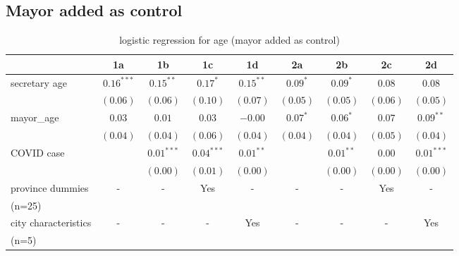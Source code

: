 \documentclass{article}
\begin{document}
\begin{CJK}{UTF8}{gbsn}
\subsection{Mayor added as control}
\begin{table}[H]
\caption{logistic regression for age (mayor added as control)}
\begin{center}
\begin{tabular}{l c c c c c c c c}
\hline
 & 1a & 1b & 1c & 1d & 2a & 2b & 2c & 2d \\
\hline
secretary age  & $0.16^{***}$ & $0.15^{**}$  & $0.17^{*}$   & $0.15^{**}$ & $0.09^{*}$ & $0.09^{*}$  & $0.08$    & $0.08$       \\
               & $(0.06)$     & $(0.06)$     & $(0.10)$     & $(0.07)$    & $(0.05)$   & $(0.05)$    & $(0.06)$  & $(0.05)$     \\
mayor\_age     & $0.03$       & $0.01$       & $0.03$       & $-0.00$     & $0.07^{*}$ & $0.06^{*}$  & $0.07$    & $0.09^{**}$  \\
               & $(0.04)$     & $(0.04)$     & $(0.06)$     & $(0.04)$    & $(0.04)$   & $(0.04)$    & $(0.05)$  & $(0.04)$     \\
COVID case     &              & $0.01^{***}$ & $0.04^{***}$ & $0.01^{**}$ &            & $0.01^{**}$ & $0.00$    & $0.01^{***}$ \\
               &              & $(0.00)$     & $(0.01)$     & $(0.00)$    &            & $(0.00)$    & $(0.00)$  & $(0.00)$     \\
province dummies &-&-&Yes&-&-&-&Yes&- \\
(n=25)\\
city characteristics &-&-&-&Yes&-&-&-&Yes \\
(n=5)\\


\end{tabular}
\end{center}
\end{table}
\end{CJK}
\end{document}
